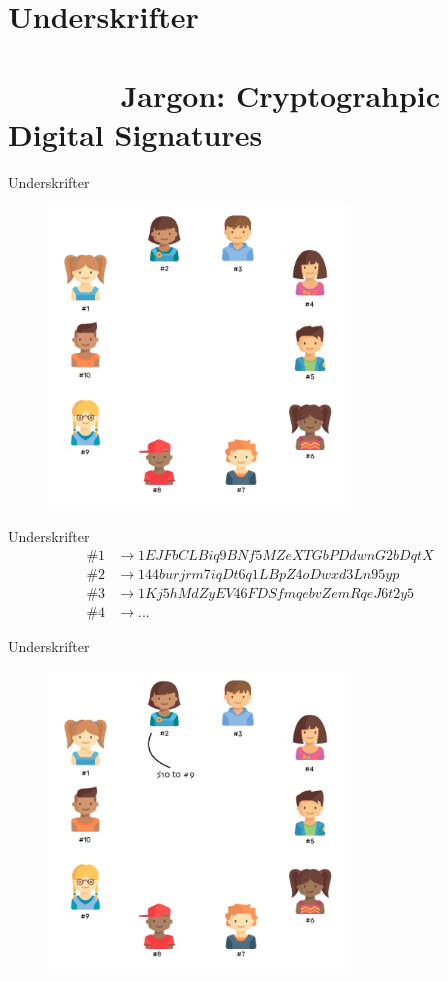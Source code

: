\documentclass[usenames, dvipsnames]{beamer}
\begin{document}
\section{Underskrifter \ \ \ \ \ \ \ \ \ \ \ \ \ \ \ \ \ \ \ \ \ \ \ \ \ \ \ \ \ \ \ \ \ \ \ \ \ \ \small Jargon: Cryptograhpic Digital Signatures}
  \begin{frame}{Underskrifter}
    \begin{figure}[ht!]
    \centering
    \includegraphics[width=80mm]{images/all_people.png}
    \end{figure}
  \end{frame}
  \begin{frame}{Underskrifter}
      \begin{align*}
          \#1 &\to 1EJFbCLBiq9BNf5MZeXTGbPDdwnG2bDqtX\\
          \#2 &\to 144burjrm7iqDt6q1LBpZ4oDwxd3Ln95yp\\
          \#3 &\to 1Kj5hMdZyEV46FDSfmqebvZemRqeJ6t2y5\\
          \#4 &\to ...
      \end{align*}
  \end{frame}
  \begin{frame}{Underskrifter}
    \begin{figure}[ht!]
    \centering
    \includegraphics[width=80mm]{images/all_people_send.png}
    \end{figure}
  \end{frame}
\end{document}
